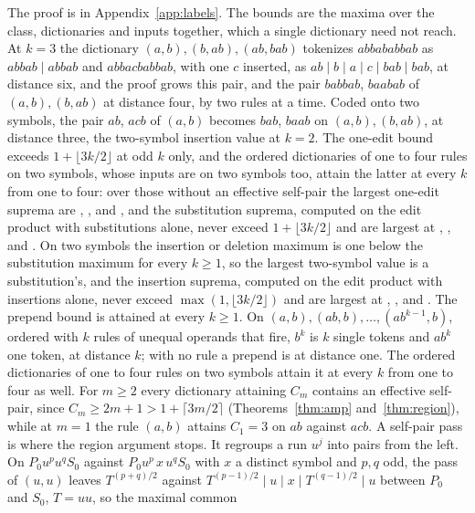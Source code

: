 \documentclass[11pt,a4paper]{article}
\theoremstyle{definition}
\theoremstyle{plain}
\begin{document}
The proof is in Appendix~\ref{app:labels}. The bounds are the maxima over the class, dictionaries and inputs together,
which a single dictionary need not reach. At \(k = 3\) the dictionary \((a, b), (b, ab), (ab, bab)\) tokenizes
\(abbababbab\) as \(abbab \mid abbab\) and \(abbacbabbab\), with one \(c\) inserted, as
\(ab \mid b \mid a \mid c \mid bab \mid bab\), at distance six, and the proof grows this pair, and the pair \(babbab\),
\(baabab\) of \((a, b), (b, ab)\) at distance four, by two rules at a time. Coded onto two symbols, the pair \(ab\),
\(acb\) of \((a, b)\) becomes \(bab\), \(baab\) on \((a, b), (b, ab)\), at distance three, the two-symbol insertion
value at \(k = 2\). The one-edit bound exceeds \(1 + \lfloor 3k/2 \rfloor\) at odd \(k\) only, and the ordered
dictionaries of one to four rules on two symbols, whose inputs are on two symbols too, attain the latter at every \(k\)
from one to four: over those without an effective self-pair the largest one-edit suprema are \NoselfEditOne{},
\NoselfEditTwo{}, \NoselfEditThree{} and \NoselfEditFour{}, and the substitution suprema, computed on the edit product
with substitutions alone, never exceed \(1 + \lfloor 3k/2 \rfloor\) and are largest at \NoselfSubOne{}, \NoselfSubTwo{},
\NoselfSubThree{} and \NoselfSubFour{}. On two symbols the insertion or deletion maximum is one below the substitution
maximum for every \(k \ge 1\), so the largest two-symbol value is a substitution's, and the insertion suprema, computed
on the edit product with insertions alone, never exceed \(\max(1, \lfloor 3k/2 \rfloor)\) and are largest at
\NoselfInsOne{}, \NoselfInsTwo{}, \NoselfInsThree{} and \NoselfInsFour{}. The prepend bound is attained at every
\(k \ge 1\). On \((a, b), (ab, b), \dots, (ab^{k-1}, b)\), ordered with \(k\) rules of unequal operands that fire,
\(b^k\) is \(k\) single tokens and \(ab^k\) one token, at distance \(k\); with no rule a prepend is at distance one. The
ordered dictionaries of one to four rules on two symbols attain it at every \(k\) from one to four as well. For
\(m \ge 2\) every dictionary attaining \(C_m\) contains an effective self-pair, since
\(C_m \ge 2m + 1 > 1 + \lceil 3m/2 \rceil\) (Theorems~\ref{thm:amp} and~\ref{thm:region}), while at \(m = 1\) the rule
\((a, b)\) attains \(C_1 = 3\) on \(ab\) against \(acb\). A self-pair pass is where the region argument stops. It
regroups a run \(u^j\) into pairs from the left. On \(P_0 u^p u^q S_0\) against \(P_0 u^p\, x\, u^q S_0\) with \(x\) a
distinct symbol and \(p, q\) odd, the pass of \((u, u)\) leaves \(T^{(p+q)/2}\) against
\(T^{(p-1)/2} \mid u \mid x \mid T^{(q-1)/2} \mid u\) between \(P_0\) and \(S_0\), \(T = uu\), so the maximal common
\end{document}
